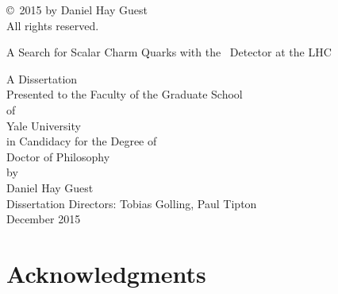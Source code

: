 \documentclass{report}
\title{\titletext}
\author{\authortext}
\newcommand{\titletext}{A Search for Scalar Charm Quarks with the \atlas\ Detector at the LHC}
\newcommand{\abstracttext}{
This thesis presents the results of a search for pair-produced scalar charm quarks with the \atlas\ detector at the LHC.
The search uses $20.3\,\invfb$ of data collected during the $\cmenergy$ 2012 run.
Each charm quark decays to neutralinos and charm quarks, resulting in a final state consisting of two charm jets and missing transverse energy.
A novel ``charm tagging'' algorithm was developed to separate this signature from backgrounds, and is discussed in detail.
As no evidence of physics beyond the standard model is found, the search is used to set exclusions with $95\%$ confidence in the scalar charm vs neutralino mass plane.
}
\newcommand{\authortext}{Daniel Hay Guest}
\begin{document}
\begin{abstract}
  \begin{center}
    \begin{large}
      \titletext \\[0.5em]
    \end{large}
    \authortext \\[0.5em]
    2015 \\[2em]
    \begin{minipage}{\textwidth}
      \doublespacing
      \abstracttext
    \end{minipage}
  \end{center}
\end{abstract}

\thispagestyle{plain}
\null\vspace{3in}
\noindent \copyright\ 2015 by \authortext \\
All rights reserved.
\clearpage

\begin{titlepage}
  \begin{center}
    \begin{huge}
      \titletext \\
    \end{huge}
    \vspace{1in}
    A Dissertation \\
    Presented to the Faculty of the Graduate School \\
    of \\
    Yale University \\
    in Candidacy for the Degree of \\
    Doctor of Philosophy \\
    \vspace{1in}
    by \\
    \authortext \\
    \vspace{1cm}
    Dissertation Directors: Tobias Golling, Paul Tipton \\
    \vspace{1cm}
    December 2015
  \end{center}
\end{titlepage}

\chapter*{Acknowledgments}

\clearpage
\end{document}
